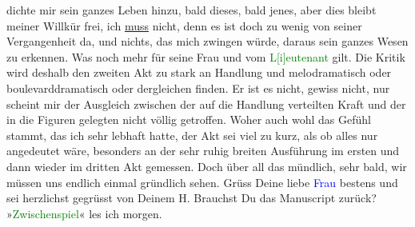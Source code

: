                dichte mir sein ganzes Leben hinzu, bald dieses, bald jenes, aber dies bleibt meiner
               Willkür frei, ich \uline{muss} nicht, denn es ist doch zu
               wenig von seiner Vergangenheit da, und nichts, das mich zwingen würde, daraus sein
               ganzes Wesen zu erkennen. Was noch mehr für seine Frau und vom \textcolor{green}{L{[}i{]}eutenant}{} gilt. Die
               Kritik wird deshalb den zweiten Akt zu stark an Handlung und melodramatisch oder
               boulevarddramatisch oder dergleichen finden. Er ist es nicht, gewiss nicht, nur
               scheint mir der Ausgleich zwischen der auf die Handlung verteilten Kraft und der in
               die Figuren gelegten nicht völlig getroffen. Woher auch wohl das Gefühl stammt, das
               ich sehr lebhaft hatte, der Akt sei viel zu kurz, als ob alles nur angedeutet wäre,
               besonders an der sehr ruhig breiten Ausführung im ersten und dann wieder im dritten
               Akt gemessen. Doch über all das mündlich, sehr bald, wir müssen uns endlich einmal
               gründlich sehen. Grüss Deine liebe \textcolor{blue}{Frau}{} bestens und sei herzlichst gegrüsst von Deinem\pend
           \pstart \spacefill\mbox{H.}\pend{}\pstart
           \noindent{}Brauchst Du das Manuscript zurück? »\textcolor{green}{Zwischenspiel}{}\ledrightnote{\textcolor{green}{Zwischenspiel. Komödie in drei Akten}}« les ich morgen.\pend
           \endnumbering{}  
      